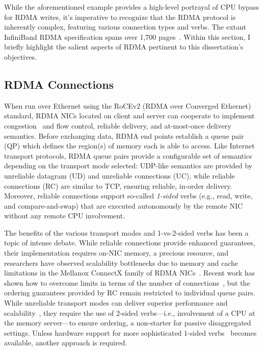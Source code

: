 \documentclass[12pt]{ucsddissertation}
\begin{document}
While the aforementioned example provides a high-level portrayal of CPU bypass for RDMA writes, it's
imperative to recognize that the RDMA protocol is inherently complex, featuring various connection
types and verbs. The extant InfiniBand RDMA specification spans over 1,700
pages~\cite{infiniband-spec}. Within this section, I briefly highlight the salient aspects of RDMA
pertinent to this dissertation's objectives.








\subsection{RDMA Connections}

When run over Ethernet using the RoCEv2 (RDMA over Converged Ethernet) standard, RDMA NICs located
on client and server can cooperate to implement congestion~\cite{hpcc,dcqcn} and flow control,
reliable delivery, and at-most-once delivery semantics.  Before exchanging data, RDMA end points
establish a queue pair (QP) which defines the region(s) of memory each is able to access.  Like
Internet transport protocols, RDMA queue pairs provide a configurable set of semantics depending on
the transport mode selected: UDP-like semantics are provided by unreliable datagram (UD) and
unreliable connections (UC), while reliable connections (RC) are similar to TCP, ensuring reliable,
in-order delivery.  Moreover, reliable connections support so-called \emph{1-sided} verbs (e.g.,
read, write, and compare-and-swap) that are executed autonomously by the remote NIC without any
remote CPU involvement.

The benefits of the various transport modes and 1-vs-2-sided verbs has been a topic of intense
debate.  While reliable connections provide enhanced guarantees, their implementation requires
on-NIC memory, a precious resource, and researchers have observed scalability bottlenecks due to
memory and cache limitations in the Mellanox ConnectX family of RDMA
NICs~\cite{farm,fasst,erpc,lite,design-guidelines}.  Recent work has shown how to overcome limits in
terms of the number of connections~\cite{storm,flock}, but the ordering guarantees provided by RC
remain restricted to individual queue pairs.  While unreliable transport modes can deliver superior
performance and scalability~\cite{fasst}, they require the use of 2-sided verbs---i.e., involvement
of a CPU at the memory server---to ensure ordering, a non-starter for passive disaggregated
settings.  Unless hardware support for more sophisticated 1-sided verbs~\cite{filemr,rma,star}
becomes available, another approach is required.
\end{document}
